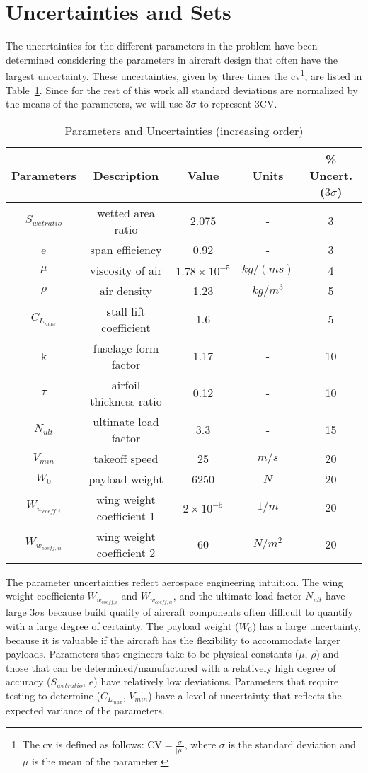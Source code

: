\section{Uncertainties and Sets}

The uncertainties for the different parameters in the problem have been determined
considering the parameters in aircraft design that often have the largest uncertainty.
These uncertainties, given by three times the \gls{cv}\footnote{The \gls{cv}
is defined as follows: $\text{CV} = \frac{\sigma}{|\mu|}$, where $\sigma$ is the standard deviation and $\mu$ is the mean of the parameter.},
are listed in Table~\ref{tab:uncertainties}. Since for the rest of this work
all standard deviations are normalized by the means of the parameters, we will use $3\sigma$
to represent $3\text{CV}$.

\begin{table}
\begin{center}
\caption{\label{tab:uncertainties} Parameters and Uncertainties (increasing order)}
\begin{tabular}{c c c c c}
\hline
Parameters & Description & Value & Units &\% Uncert. ($3\sigma$) \\
\hline
$S_{wetratio}$ & wetted area ratio & 2.075 & - & 3\\
e & span efficiency & 0.92 & - & 3\\
$\mu$ & viscosity of air & $1.78 \times 10^{-5}$ & $kg/(ms)$ & 4 \\
$\rho$ & air density & 1.23 & $kg/m^3$ & 5 \\
$C_{L_{max}}$ & stall lift coefficient & 1.6 & - & 5\\
k & fuselage form factor & 1.17 & - & 10\\
$\tau$ & airfoil thickness ratio & 0.12 & - & 10\\
$N_{ult}$ & ultimate load factor & 3.3 & - & 15\\
$V_{min}$ & takeoff speed & 25 & $m/s$ & 20\\
$W_0$ & payload weight & 6250 & $N$ & 20\\
$W_{w_{coeff,i}}$ & wing weight coefficient 1 & $2 \times 10^{-5}$ & $1/m$ & 20\\
$W_{w_{coeff,ii}}$ & wing weight coefficient 2 & 60 & $N/m^2$ & 20\\
\hline
\end{tabular}
\end{center}
\end{table}

The parameter uncertainties reflect aerospace engineering intuition.
The wing weight coefficients $W_{w_{coeff,i}}$ and $W_{w_{coeff,ii}}$, and the ultimate load factor $N_{ult}$ have
large $3\sigma$s because build quality of aircraft components often difficult to quantify with a large degree of certainty.
The payload weight ($W_0$) has a large uncertainty, because it is valuable if the aircraft
has the flexibility to accommodate larger payloads. Parameters that engineers take to be
physical constants ($\mu$, $\rho$) and those that can be determined/manufactured with a relatively
high degree of accuracy ($S_{wetratio}$, $e$) have relatively low deviations.
Parameters that require testing to determine ($C_{L_{max}}$, $V_{min}$) have a level of uncertainty
that reflects the expected variance of the parameters.
